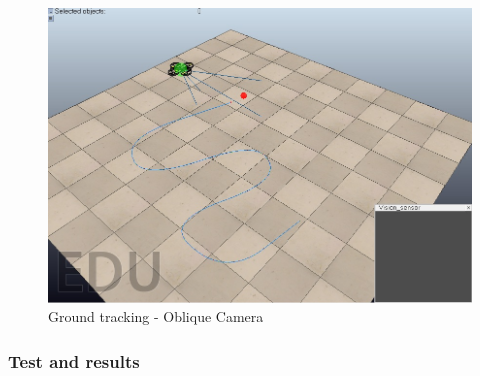 \begin{figure}[ph]
	\centering
	\includegraphics[width=0.7\linewidth]{../Images/c3/ground_tracking_scene_oblique}
	\caption{Ground tracking - Oblique Camera}
	\label{fig:ground_tracking_scene_oblique}
\end{figure}

\subsubsection{Test and results}


